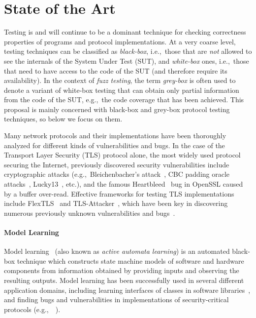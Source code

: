 \documentclass[11pt]{article}
\newcommand{\system}[1]{\mbox{\textsf{#1}}}
\newcommand{\myparagraph}{}
\let\myparagraph=\paragraph
\renewcommand{\paragraph}{\vspace{-3mm}\myparagraph}
\newcommand{\eg}{e.\/g.,\ }
\newcommand{\ie}{i.\/e.,\ }
\begin{document}
\section{State of the Art} \label{sec:SOTA}
Testing is and will continue to be a dominant technique for checking
correctness properties of programs and protocol implementations.  At a very
coarse level, testing techniques can be classified as \emph{black-box},
\ie those that are \emph{not} allowed to see the internals of the System Under
Test (SUT), and \emph{white-box} ones, \ie those that need to have access to
the code of the SUT (and therefore require its availability).  In the context
of \emph{fuzz testing}, the term \emph{grey-box} is often used to denote a
variant of white-box testing that can obtain only partial information from the
code of the SUT, \eg the code coverage that has been achieved.
%
This proposal is mainly concerned with black-box and grey-box protocol testing
techniques, so below we focus on them.

Many network protocols and their implementations have been thoroughly analyzed
for different kinds of vulnerabilities and bugs. In the case of the Transport
Layer Security (TLS) protocol alone, the most widely used protocol securing
the Internet, previously discovered security vulnerabilities include
cryptographic attacks (\eg Bleichenbacher's attack~\cite{Bleichenbacher1998},
CBC padding oracle attacks~\cite{Vaudenay:CBCWeaknesses:02},
Lucky13~\cite{Lucky13@SP-13}, etc.), and the famous
Heartbleed~\cite{heartbleed} bug in OpenSSL caused by a buffer over-read.
%
Effective frameworks for testing TLS implementations include
\system{FlexTLS}~\cite{FlexTLS@WOOT-15} and
\system{TLS-Attacker}~\cite{somorovsky2016}, which have been key in discovering
numerous previously unknown vulnerabilities and bugs~\cite{MessyTLS@CACM-17}.

\paragraph{Model Learning}
Model learning~\cite{Angluin1987,Vaandrager@CACM-17} (also known as
\emph{active automata learning}) is an automated black-box technique which
constructs state machine models of software and hardware components from
information obtained by providing inputs and observing the resulting
outputs. Model learning has been successfully used in several different
application domains, including learning interfaces of classes in software
libraries~\cite{HowarISBJ12}, and finding bugs and vulnerabilities in
implementations of security-critical protocols
(\eg~\cite{AJUV15,CPPR14,dRP15,FJV2016,SSH@SPIN-17,DTLS@USENIX-20}).
\end{document}
